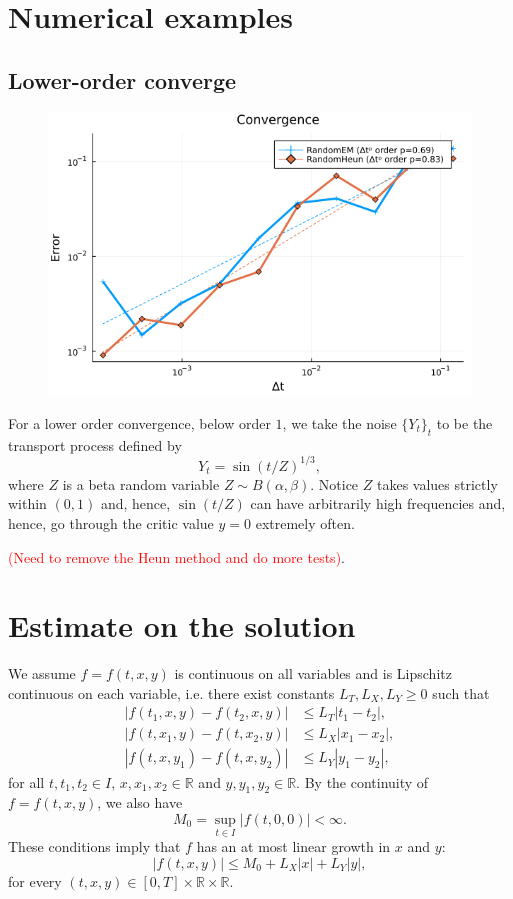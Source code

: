 \documentclass[reqno,12pt]{amsart}
\theoremstyle{plain}%
\theoremstyle{definition}
\begin{document}
\section{Numerical examples}

\subsection{Lower-order converge}

\begin{figure}
  \includegraphics[scale=0.8]{img/plot_13.png}
\end{figure}

For a lower order convergence, below order $1$, we take the noise $\{Y_t\}_t$ to be the transport process defined by
$$
Y_t = \sin(t/Z)^{1/3},
$$
where $Z$ is a beta random variable $Z \sim B(\alpha, \beta)$. Notice $Z$ takes values strictly within $(0, 1)$ and, hence, $\sin(t/Z)$ can have arbitrarily high frequencies and, hence, go through the critic value $y = 0$ extremely often.

\textcolor{red}{(Need to remove the Heun method and do more tests)}.

\section{Estimate on the solution}

We assume $f=f(t, x, y)$ is continuous on all variables and is Lipschitz continuous on each variable, i.e. there exist constants $L_T, L_X, L_Y \geq 0$ such that
\begin{align}
  |f(t_1, x, y) - f(t_2, x, y)| & \leq L_T |t_1-t_2|, \\
  |f(t, x_1, y) - f(t, x_2, y)| & \leq L_X |x_1 - x_2|, \\
  |f(t, x, y_1) - f(t, x, y_2)| & \leq L_Y |y_1 - y_2|,
\end{align}
for all $t, t_1, t_2 \in I$, $x, x_1, x_2 \in \mathbb{R}$ and $y, y_1, y_2\in \mathbb{R}$. By the continuity of $f=f(t, x, y)$, we also have
$$
M_0 = \sup_{t\in I} |f(t, 0, 0)| < \infty.
$$
These conditions imply that $f$ has an at most linear growth in $x$ and $y$:
\begin{equation}
    \label{Mfestimate}
    |f(t, x, y)| \leq M_0 + L_X|x| + L_Y|y|,
\end{equation}
for every $(t, x, y) \in [0, T] \times \mathbb{R} \times \mathbb{R}$.
\end{document}
